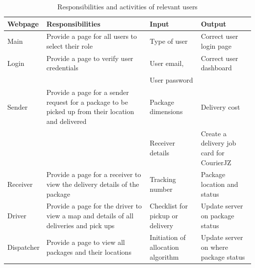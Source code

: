 \documentclass[paper=a4, fontsize=11pt]{scrartcl} %
\numberwithin{equation}{section} %
\numberwithin{figure}{section} %
\numberwithin{table}{section} %
\begin{document}
\begin{table}[]
\centering
\caption{Responsibilities and activities of relevant users}
\label{my-label}
\begin{tabular}{|p{2cm}|p{4cm}|p{4cm}|p{4cm}|}
\hline
\textbf{Webpage}            & \textbf{Responsibilities}                                                                           & \textbf{Input}                     & \textbf{Output}                                          \\ \hline
Main                        & Provide a page for all users to select their role                                                   & Type of user                       & Correct user login page                                  \\ \hline
Login                       & Provide a page to verify user credentials                                                           & User email,                        & Correct user dashboard                                   \\ \hline
                            &                                                                                                     & User password                      &                                                          \\ \hline
Sender                      & Provide a page for a sender request for a package to be picked up from their location and delivered & Package dimensions                 & Delivery cost                                            \\ \hline
                            &                                                                                                     & Receiver details                   & Create a delivery job card for CourierJZ                 \\ \hline
Receiver                    & Provide a page for a receiver to view the delivery details of the package                           & Tracking number                    & Package location and status                              \\ \hline
Driver                      & Provide a page for the driver to view a map and details of all deliveries and pick ups              & Checklist for pickup or delivery   & Update server on package status                          \\ \hline
Dispatcher                  & Provide a page to view all packages and their locations                                             & Initiation of allocation algorithm & Update server on where package status                    \\ \hline

\end{tabular}
\end{table}
\end{document}
